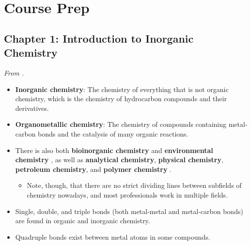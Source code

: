\documentclass[../notes.tex]{subfiles}
\begin{document}
\chapter{Course Prep}
\section{Chapter 1: Introduction to Inorganic Chemistry}
\emph{From \textcite{bib:MiesslerFischerTarr}.}
\begin{itemize}
    \item {}\textbf{Inorganic chemistry}: The chemistry of everything that is not organic chemistry, which is the chemistry of hydrocarbon compounds and their derivatives.
    \item \textbf{Organometallic chemistry}: The chemistry of compounds containing metal-carbon bonds and the catalysis of many organic reactions.
    \item There is also both \textbf{bioinorganic chemistry} and \textbf{environmental chemistry} \parencite[1]{bib:MiesslerFischerTarr}, as well as \textbf{analytical chemistry}, \textbf{physical chemistry}, \textbf{petroleum chemistry}, and \textbf{polymer chemistry} \parencite[4]{bib:MiesslerFischerTarr}.
    \begin{itemize}
        \item Note, though, that there are no strict dividing lines between subfields of chemistry nowadays, and most professionals work in multiple fields.
    \end{itemize}
    \item Single, double, and triple bonds (both metal-metal and metal-carbon bonds) are found in organic and inorganic chemistry.
    \item Quadruple bonds exist between metal atoms in some compounds.
    \begin{figure}[h!]
        \centering
        \begin{subfigure}[b]{0.3\linewidth}
            \centering
\end{subfigure}
\end{figure}
\end{itemize}
\end{document}
